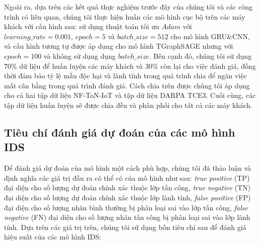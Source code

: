 \begin{table}[ht]
    \centering
    \caption{Kiến trúc của mô hình TGraphSAGE}
    \label{tab:graphsage-model-architecture}
\end{table}

\bigbreak\noindent
Ngoài ra, dựa trên các kết quả thực nghiệm trước đây của chúng tôi và các công trình có liên quan, chúng tôi thực hiện huấn các mô hình cục bộ trên các máy khách với cấu hình sau: sử dụng thuật toán tối ưu $Adam$ với $learning\_rate=0.001$, $epoch=5$ và $batch\_size=512$ cho mô hình GRU\&CNN, và cấu hình tương tự được áp dụng cho mô hình TGraphSAGE nhưng với $epoch=100$ và không sử dụng dụng $batch\_size$. Bên cạnh đó, chúng tôi sử dụng 70\% dữ liệu để huấn luyện các máy khách và 30\% còn lại cho việc đánh giá, đồng thời đảm bảo tỷ lệ mẫu độc hại và lành tính trong quá trình chia để ngăn việc mất cân bằng trong quá trình đánh giá. Cách chia trên được chúng tôi áp dụng cho cả hai tập dữ liệu NF-ToN-IoT và tập dữ liệu DARPA TCE3. Cuối cùng, các tập dữ liệu huấn luyện sẽ được chia đều và phân phối cho tất cả các máy khách.

\subsection{Tiêu chí đánh giá dự đoán của các mô hình IDS} \label{sec:detection-metric}
Để đánh giá dự đoán của mô hình một cách phù hợp, chúng tôi đã thảo luận và định nghĩa các giá trị đầu ra có thể có của mô hình như sau: \textit{true positive} (TP) đại diện cho số lượng dự đoán chính xác thuộc lớp tấn công, \textit{true negative} (TN) đại diện cho số lượng dự đoán chính xác thuộc lớp lành tính, \textit{false positive} (FP) đại diện cho số lượng nhãn bình thường bị phân loại sai vào lớp tấn công, \textit{false negative} (FN) đại diện cho số lượng nhãn tấn công bị phân loại sai vào lớp lành tính.
\bigbreak\noindent
Dựa trên các giá trị trên, chúng tôi sử dụng bốn tiêu chí sau để đánh giá hiệu suất của các mô hình IDS:

